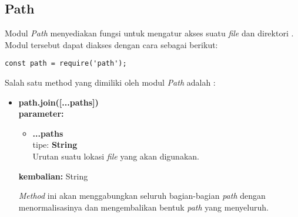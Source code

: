 \begin{itemize}
\end{itemize}

\subsection{Path}
Modul \textit{Path} menyediakan fungsi untuk mengatur akses suatu \textit{file} dan direktori \cite{dahl:09:nodejsdocs}. Modul tersebut dapat diakses dengan cara sebagai berikut:

\begin{lstlisting}
const path = require('path');
\end{lstlisting}

Salah satu method yang dimiliki oleh modul \textit{Path} adalah : 

\begin{itemize}
	\item \textbf{path.join([...paths])} \\ 
	\textbf{parameter:} 
	\begin{itemize}
		\item \textbf{...paths} \\ tipe: \textbf{String} \\ Urutan suatu lokasi \textit{file} yang akan digunakan.
	\end{itemize}

	\textbf{kembalian:} String
	
	\textit{Method} ini akan menggabungkan seluruh bagian-bagian \textit{path} dengan menormalisasinya dan mengembalikan bentuk \textit{path} yang menyeluruh.
\end{itemize}

